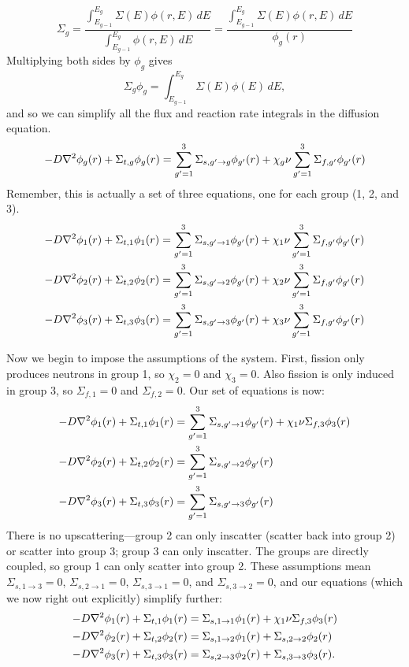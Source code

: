\documentclass{report}
\begin{document}
\begin{enumerate}[a)]
$$ \Sigma_g = \frac{\int_{E_{g-1}}^{E_g} \Sigma(E)\phi(r,E)\,dE}{\int_{E_{g-1}}^{E_g} \phi(r,E)\,dE} = \frac{\int_{E_{g-1}}^{E_g} \Sigma(E)\phi(r,E)\,dE}{\phi_g(r)} $$
Multiplying both sides by $\phi_g$ gives
$$ \Sigma_g \phi_g = \int_{E_{g-1}}^{E_g} \Sigma(E)\phi(E)\,dE ,$$
and so we can simplify all the flux and reaction rate integrals in the diffusion equation.
$$ -D \nabla^2 \phi_g(r) + \Sigma_{t,g} \phi_g(r) = \sum_{g'=1}^3 \Sigma_{s,g' \rightarrow g}\phi_{g'}(r) + \chi_g \nu \sum_{g'=1}^3 \Sigma_{f,g'}\phi_{g'}(r) $$
Remember, this is actually a set of three equations, one for each group (1, 2, and 3).
\begin{align*}
-D \nabla^2 \phi_1(r) + \Sigma_{t,1} \phi_1(r) &= \sum_{g'=1}^3 \Sigma_{s,g' \rightarrow 1}\phi_{g'}(r) + \chi_1 \nu \sum_{g'=1}^3 \Sigma_{f,g'}\phi_{g'}(r) \\
-D \nabla^2 \phi_2(r) + \Sigma_{t,2} \phi_2(r) &= \sum_{g'=1}^3 \Sigma_{s,g' \rightarrow 2}\phi_{g'}(r) + \chi_2 \nu \sum_{g'=1}^3 \Sigma_{f,g'}\phi_{g'}(r) \\
-D \nabla^2 \phi_3(r) + \Sigma_{t,3} \phi_3(r) &= \sum_{g'=1}^3 \Sigma_{s,g' \rightarrow 3}\phi_{g'}(r) + \chi_3 \nu \sum_{g'=1}^3 \Sigma_{f,g'}\phi_{g'}(r)
\end{align*}

Now we begin to impose the assumptions of the system. First, fission only produces neutrons in group 1, so $\chi_2 = 0$ and $\chi_3 = 0$. Also fission is only induced in group 3, so $\Sigma_{f,1} = 0$ and $\Sigma_{f,2} = 0$. Our set of equations is now:
\begin{align*}
-D \nabla^2 \phi_1(r) + \Sigma_{t,1} \phi_1(r) &= \sum_{g'=1}^3 \Sigma_{s,g' \rightarrow 1}\phi_{g'}(r) + \chi_1 \nu \Sigma_{f,3}\phi_{3}(r) \\
-D \nabla^2 \phi_2(r) + \Sigma_{t,2} \phi_2(r) &= \sum_{g'=1}^3 \Sigma_{s,g' \rightarrow 2}\phi_{g'}(r) \\
-D \nabla^2 \phi_3(r) + \Sigma_{t,3} \phi_3(r) &= \sum_{g'=1}^3 \Sigma_{s,g' \rightarrow 3}\phi_{g'}(r) 
\end{align*}
There is no upscattering---group 2 can only inscatter (scatter back into group 2) or scatter into group 3; group 3 can only inscatter. The groups are directly coupled, so group 1 can only scatter into group 2. These assumptions mean $\Sigma_{s,1 \rightarrow 3} = 0$, $\Sigma_{s,2 \rightarrow 1} = 0$, $\Sigma_{s,3 \rightarrow 1} = 0$, and $\Sigma_{s,3 \rightarrow 2} = 0$, and our equations (which we now right out explicitly) simplify further:
\begin{align*}
-D \nabla^2 \phi_1(r) + \Sigma_{t,1} \phi_1(r) &= \Sigma_{s,1 \rightarrow 1}\phi_1(r) + \chi_1 \nu \Sigma_{f,3}\phi_{3}(r) \\
-D \nabla^2 \phi_2(r) + \Sigma_{t,2} \phi_2(r) &= \Sigma_{s,1 \rightarrow 2}\phi_1(r) +\Sigma_{s,2 \rightarrow 2}\phi_2(r) \\
-D \nabla^2 \phi_3(r) + \Sigma_{t,3} \phi_3(r) &= \Sigma_{s,2 \rightarrow 3}\phi_{2}(r) + \Sigma_{s,3 \rightarrow 3}\phi_{3}(r).\\
\end{align*}


\end{enumerate}
\end{document}
